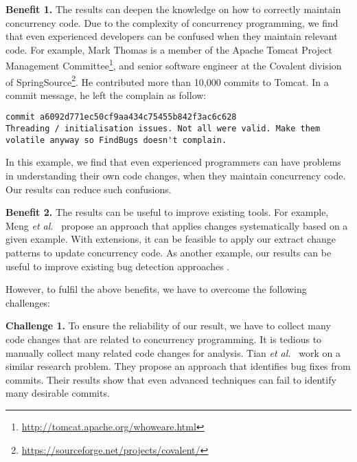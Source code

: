 \noindent
\textbf{Benefit 1.} The results can deepen the knowledge on how to correctly maintain concurrency code. Due to the complexity of concurrency programming, we find that even experienced developers can be confused when they maintain relevant code. For example, Mark Thomas is a member of the Apache Tomcat Project Management Committee\footnote{\url{http://tomcat.apache.org/whoweare.html}}, and senior software engineer at the Covalent division of SpringSource\footnote{\url{https://sourceforge.net/projects/covalent/}}. He contributed more than 10,000 commits to Tomcat. In a commit message, he left the complain as follow:

\lstset{numbers=left, breaklines=true,  basicstyle=\ttfamily\tiny,  xleftmargin=3em, tabsize=2}
\begin{lstlisting}
commit a6092d771ec50cf9aa434c75455b842f3ac6c628
Threading / initialisation issues. Not all were valid. Make them volatile anyway so FindBugs doesn't complain.
\end{lstlisting}

\noindent
In this example, we find that even experienced programmers can have problems in understanding their own code changes, when they maintain concurrency code. Our results can reduce such confusions.


\noindent
\textbf{Benefit 2.} The results can be useful to improve existing tools. For example, Meng \emph{et al.}~\cite{conf/pldi/MengKM11} propose an approach that applies changes systematically based on a given example. With extensions, it can be feasible to apply our extract change patterns to update concurrency code. As another example, our results can be useful to improve existing bug detection approaches \cite{conf/ppopp/SamakR14, conf/sigsoft/EslamimehrP14}.

However, to fulfil the above benefits, we have to overcome the following challenges:

\noindent
\textbf{Challenge 1.} To ensure the reliability of our result, we have to collect many code changes that are related to concurrency programming. It is tedious to manually collect many related code changes for analysis. Tian \emph{et al.}~\cite{tian2012identifying} work on a similar research problem. They propose an approach that identifies bug fixes from commits. Their results show that even advanced techniques can fail to identify many desirable commits.


